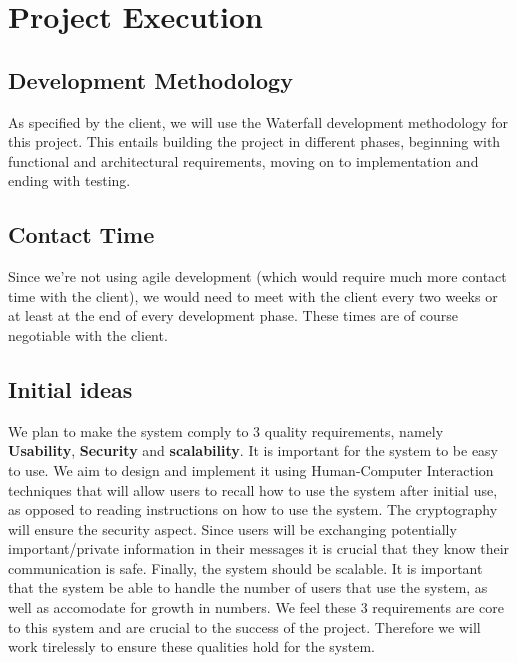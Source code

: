 \documentclass[12pt]{article}
\begin{document}


\newpage
\tableofcontents

\newpage


\newpage

\section{Project Execution}

\subsection{Development Methodology}
\par{As specified by the client, we will use the Waterfall development methodology for this project. This entails building the project in different phases, beginning with functional and architectural requirements, moving on to implementation and ending with testing.}

\subsection{Contact Time}
\par{Since we're not using agile development (which would require much more contact time with the client), we would need to meet with the client every two weeks or at least at the end of every development phase. These times are of course negotiable with the client.}

\subsection{Initial ideas}
\par{We plan to make the system comply to 3 quality requirements, namely \textbf{Usability}, \textbf{Security} and \textbf{scalability}. It is important for the system to be easy to use. We aim to design and implement it using Human-Computer Interaction techniques that will allow users to recall how to use the system after initial use, as opposed to reading instructions on how to use the system. \newline The cryptography will ensure the security aspect. Since users will be exchanging potentially important/private information in their messages it is crucial that they know their communication is safe. \newline Finally, the system should be scalable. It is important that the system be able to handle the number of users that use the system, as well as accomodate for growth in numbers. \newline We feel these 3 requirements are core to this system and are crucial to the success of the project. Therefore we will work tirelessly to ensure these qualities hold for the system.}
\end{document}
